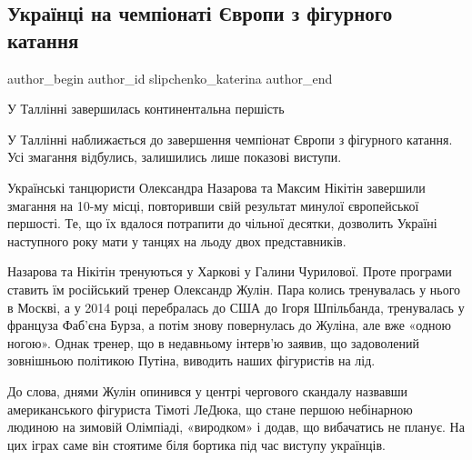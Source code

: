  
 
 
 
 
\subsection{Українці на чемпіонаті Європи з фігурного катання}
\label{sec:16_01_2022.stz.news.ua.zaxid.1.figurnoje_katanie_ukraina}

\ifcmt
 author_begin
   author_id slipchenko_katerina
 author_end
\fi

\begin{zznagolos}
У Таллінні завершилась континентальна першість
\end{zznagolos}

У Таллінні наближається до завершення чемпіонат Європи з фігурного катання. Усі
змагання відбулись, залишились лише показові виступи.

Українські танцюристи Олександра Назарова та Максим Нікітін завершили змагання
на 10-му місці, повторивши свій результат минулої європейської першості. Те, що
їх вдалося потрапити до чільної десятки, дозволить Україні наступного року мати
у танцях на льоду двох представників.


Назарова та Нікітін тренуються у Харкові у Галини Чурилової. Проте програми
ставить їм російський тренер Олександр Жулін. Пара колись тренувалась у нього в
Москві, а у 2014 році перебралась до США до Ігоря Шпільбанда, тренувалась у
француза Фаб’єна Бурза, а потім знову повернулась до Жуліна, але вже «одною
ногою». Однак тренер, що в недавньому інтерв’ю заявив, що задоволений
зовнішньою політикою Путіна, виводить наших фігуристів на лід.

До слова, днями Жулін опинився у центрі чергового скандалу назвавши
американського фігуриста Тімоті ЛеДюка, що стане першою небінарною людиною на
зимовій Олімпіаді, «виродком» і додав, що вибачатись не планує. На цих іграх
саме він стоятиме біля бортика під час виступу українців.

